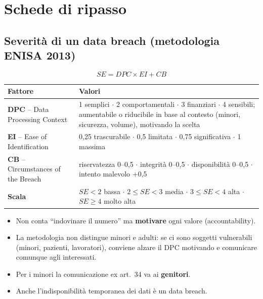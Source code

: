 \chapter{Schede di ripasso}
\label{cap:schede}

\section{Severità di un data breach (metodologia ENISA 2013)}

\[
SE = DPC \times EI + CB
\]

\begin{center}
\small
\begin{tabularx}{\linewidth}{l X}
\toprule
\textbf{Fattore} & \textbf{Valori} \\ \midrule
\textbf{DPC} -- Data Processing Context & 1 semplici $\cdot$ 2 comportamentali $\cdot$ 3 finanziari
  $\cdot$ 4 sensibili; aumentabile o riducibile in base al contesto (minori, sicurezza, volume),
  motivando la scelta \\
\textbf{EI} -- Ease of Identification & 0,25 trascurabile $\cdot$ 0,5 limitata $\cdot$
  0,75 significativa $\cdot$ 1 massima \\
\textbf{CB} -- Circumstances of the Breach & riservatezza 0--0,5 $\cdot$ integrità 0--0,5 $\cdot$
  disponibilità 0--0,5 $\cdot$ intento malevolo +0,5 \\
\midrule
\textbf{Scala} & $SE<2$ bassa $\cdot$ $2 \le SE < 3$ media $\cdot$ $3 \le SE < 4$ alta $\cdot$
  $SE \ge 4$ molto alta \\ \bottomrule
\end{tabularx}
\end{center}

\begin{esame}
\begin{itemize}
  \item Non conta ``indovinare il numero'' ma \textbf{motivare} ogni valore (accountability).
  \item La metodologia non distingue minori e adulti: se ci sono soggetti vulnerabili (minori,
    pazienti, lavoratori), conviene alzare il DPC motivando e comunicare comunque agli interessati.
  \item Per i minori la comunicazione ex art.~34 va ai \textbf{genitori}.
  \item Anche l'indisponibilità temporanea dei dati è un data breach.
\end{itemize}
\end{esame}

